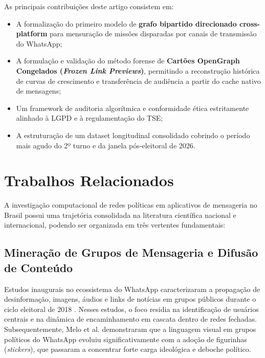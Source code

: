 \documentclass[12pt]{article}
\begin{document}
As principais contribuições deste artigo consistem em:
\begin{itemize}
    \item A formalização do primeiro modelo de \textbf{grafo bipartido direcionado cross-platform} para mensuração de missões disparadas por canais de transmissão do WhatsApp;
    \item A formulação e validação do método forense de \textbf{Cartões OpenGraph Congelados (\textit{Frozen Link Previews})}, permitindo a reconstrução histórica de curvas de crescimento e transferência de audiência a partir do cache nativo de mensagens;
    \item Um framework de auditoria algorítmica e conformidade ética estritamente alinhado à LGPD e à regulamentação do TSE;
    \item A estruturação de um dataset longitudinal consolidado cobrindo o período mais agudo do 2º turno e da janela pós-eleitoral de 2026.
\end{itemize}

\section{Trabalhos Relacionados}\label{sec:relacionados}

A investigação computacional de redes políticas em aplicativos de mensageria no Brasil possui uma trajetória consolidada na literatura científica nacional e internacional, podendo ser organizada em três vertentes fundamentais:

\subsection{Mineração de Grupos de Mensageria e Difusão de Conteúdo}
Estudos inaugurais no ecossistema do WhatsApp caracterizaram a propagação de desinformação, imagens, áudios e links de notícias em grupos públicos durante o ciclo eleitoral de 2018 \cite{resende2019whatsapp,melo2019whatsapp}. Nesses estudos, o foco residia na identificação de usuários centrais e na dinâmica de encaminhamento em cascata dentro de redes fechadas. Subsequentemente, Melo et al. \cite{melo2021sticker} demonstraram que a linguagem visual em grupos políticos do WhatsApp evoluiu significativamente com a adoção de figurinhas (\textit{stickers}), que passaram a concentrar forte carga ideológica e deboche político.
\end{document}

